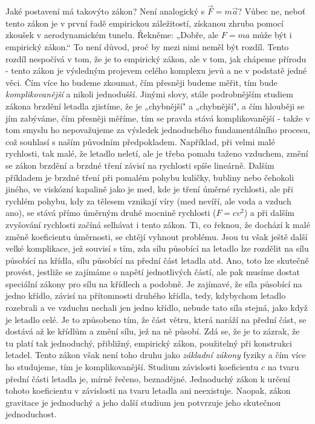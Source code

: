     Jaké postavení má takovýto zákon? Není analogický s \(\vec{F}= m\vec{a}\)? Vůbec ne, neboť 
    tento zákon je v první řadě empirickou záležitostí, získanou zhruba pomocí zkoušek v 
    aerodynamickém tunelu. Řekněme: „Dobře, ale \(F=ma\) může být i empirický zákon.“ To není 
    důvod, proč by mezi nimi neměl být rozdíl. Tento rozdíl nespočívá v tom, že je to empirický 
    zákon, ale v tom, jak chápeme přírodu - tento zákon je výsledným projevem celého komplexu jevů 
    a ne v podstatě jedné věci. Čím více ho budeme zkoumat, čím přesněji budeme měřit, tím bude 
    \emph{komplikovanější} a nikoli jednodušší. Jinými slovy, stále podrobnějším studiem zákona 
    brzdění letadla zjistíme, že je „chybnější" a „chybnější", a čím hlouběji se jím zabýváme, čím 
    přesněji měříme, tím se pravda stává komplikovanější - takže v tom smyslu ho nepovažujeme za 
    výsledek jednoduchého fundamentálního procesu, což souhlasí s naším původním předpokladem. 
    Například, při velmi malé rychlosti, tak malé, že letadlo neletí, ale je třeba pomalu taženo 
    vzduchem, změní se zákon brzdění a brzdné tření závisí na rychlosti spíše lineárně. Dalším 
    příkladem je brzdné tření při pomalém pohybu kuličky, bubliny nebo čehokoli jiného, ve viskózní 
    kapalině jako je med, kde je tření úměrné rychlosti, ale při rychlém pohybu, kdy za tělesem 
    vznikají víry (med nevíří, ale voda a vzduch ano), se stává přímo úměrným druhé mocnině 
    rychlosti (\(F=cv^2\)) a při dalším zvyšování rychlosti začíná selhávat i tento zákon. Ti, co 
    řeknou, že dochází k malé změně koeficientu úměrnosti, se chtějí vyhnout problému. Jsou tu však 
    ještě další velké komplikace, jež souvisí s tím, zda sílu působící na letadlo lze rozdělit na 
    sílu působící na křídla, sílu působící na přední část letadla atd. Ano, toto lze skutečně 
    provést, jestliže se zajímáme o napětí jednotlivých částí, ale pak musíme dostat speciální 
    zákony pro sílu na křídlech a podobně. Je zajímavé, že síla působící na jedno křídlo, závisí na 
    přítomnosti druhého křídla, tedy, kdybychom letadlo rozebrali a ve vzduchu nechali jen jedno 
    křídlo, nebude tato síla stejná, jako když je letadlo celé. Je to způsobeno tím, že část větru, 
    která naráží na přední část, se dostává až ke křídlům a změní sílu, jež na ně působí. Zdá se, 
    že je to zázrak, že tu platí tak jednoduchý, přibližný, empirický zákon, použitelný při 
    konstrukci letadel. Tento zákon však není toho druhu jako \emph{základní zákony} fyziky a čím 
    více ho studujeme, tím je komplikovanější. Studium závislosti koeficientu \(c\) na tvaru přední 
    části letadla je, mírně řečeno, beznadějné. Jednoduchý zákon k určení tohoto koeficientu v 
    závislosti na tvaru letadla ani neexistuje. Naopak, zákon gravitace je jednoduchý a jeho další 
    studium jen potvrzuje jeho skutečnou jednoduchost.
    
